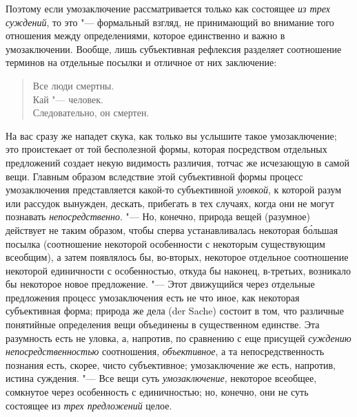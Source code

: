 Поэтому если умозаключение рассматривается только как
состоящее {\em из трех суждений},
то это "--- формальный взгляд, не принимающий во
внимание того отношения между определениями, которое единственно и важно в
умозаключении. Вообще, лишь субъективная рефлексия разделяет соотношение
терминов на отдельные посылки и отличное от них заключение:

\begin{verse}
Все люди смертны.\\
Кай "--- человек.\\
Следовательно, он смертен.
\end{verse}

На вас сразу же нападет скука, как только вы услышите такое
умозаключение; это проистекает от той бесполезной формы, которая
посредством отдельных предложений создает некую видимость различия, тотчас
же исчезающую в самой вещи. Главным образом вследствие этой субъективной
формы процесс умозаключения представляется какой-то субъективной
{\em уловкой}, к которой разум или рассудок вынужден, дескать, прибегать
в тех случаях, когда они не могут познавать {\em непосредственно}.
"--- Но, конечно, природа вещей (разумное) действует не таким
образом, чтобы сперва устанавливалась некоторая б\'{о}льшая посылка
(соотношение некоторой особенности с некоторым существующим всеобщим), а
затем появлялось бы, во-вторых, некоторое отдельное соотношение некоторой
единичности с особенностью, откуда бы наконец, в-третьих, возникало бы
некоторое новое предложение. "--- \label{bkm:bm52a}Этот
движущийся через отдельные предложения процесс умозаключения есть не что
иное, как некоторая субъективная форма; природа же дела (der Sache) состоит
в том, что различные понятийные определения вещи объединены в существенном
единстве. Эта разумность есть не уловка, а, напротив, по сравнению с еще
присущей {\em суждению
непосредственностью} соотношения,
{\em объективное}, а та
непосредственность познания есть, скорее, чисто субъективное; умозаключение
же есть, напротив, истина суждения. "--- Все вещи суть
{\em умозаключение},
некоторое всеобщее, сомкнутое через особенность с
единичностью; но, конечно, они не суть состоящее из
{\em трех предложений}
целое.

